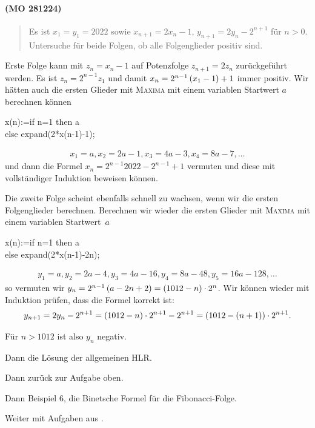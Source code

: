 \documentclass[11pt,a4paper]{article}
\newcommand{\cas}[1]{\textsc{#1}}
\begin{document}
\paragraph{(MO 281224)}
\begin{quote}
  Es ist $x_1=y_1=2022$ sowie $x_{n+1}=2x_n-1$, $y_{n+1}=2y_n-2^{n+1}$ für
  $n>0$.  Untersuche für beide Folgen, ob alle Folgenglieder positiv sind.
\end{quote}
\begin{loesung}
  Erste Folge kann mit $z_n=x_n-1$ auf Potenzfolge $z_{n+1}=2z_n$
  zurückgeführt werden. Es ist $z_n=2^{n-1}z_1$ und damit
  $x_n=2^{n-1}\left(x_1-1\right)+1$ immer positiv.  Wir hätten auch die ersten Glieder
  mit \cas{Maxima} mit einem variablen Startwert $a$ berechnen können
  \begin{code}
    x(n):=if n=1 then a\\
    else expand(2*x(n-1)-1);
  \end{code}
  \begin{gather*}
    x_1=a, x_2=2a-1, x_3=4a-3, x_4=8a-7, \dots
  \end{gather*}
  und dann die Formel $x_n=2^{n-1}2022-2^{n-1}+1$ vermuten und diese mit
  vollständiger Induktion beweisen können. 

  Die zweite Folge scheint ebenfalls schnell zu wachsen, wenn wir die ersten
  Folgenglieder berechnen.  Berechnen wir wieder die ersten Glieder mit
  \cas{Maxima} mit einem variablen Startwert~$a$ 
  \begin{code}
    x(n):=if n=1 then a\\
    else expand(2*x(n-1)-2\pw n);
  \end{code}
  \begin{gather*}
    y_1=a, y_2=2a-4, y_3=4a-16, y_4=8a-48, y_5=16a-128,\dots
  \end{gather*}
  so vermuten wir $y_n=2^{n-1}\left(a-2n+2\right)=(1012-n)\cdot 2^n$.   Wir können wieder
  mit Induktion prüfen, dass die Formel korrekt ist:
  \begin{gather*}
    y_{n+1}=2y_n-2^{n+1}=(1012-n)\cdot2^{n+1}-2^{n+1}=(1012-(n+1))\cdot2^{n+1}.
  \end{gather*}
\end{loesung}
Für $n>1012$ ist also $y_n$ negativ.


Dann die Lösung der allgemeinen HLR.

Dann zurück zur Aufgabe oben. 

Dann Beispiel 6, die Binetsche Formel für die Fibonacci-Folge.

Weiter mit Aufgaben aus \cite{S}.
\end{document}
